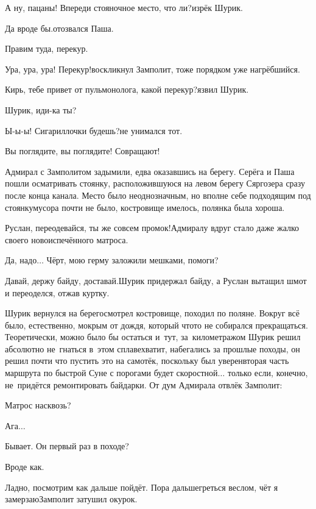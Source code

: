 \diagdash А ну, пацаны! Впереди стояночное место, что ли?\mdash изрёк Шурик.

\diagdash Да вроде бы.\mdash отозвался Паша.

\diagdash Правим туда, перекур. 

\diagdash Ура, ура, ура! Перекур!\mdash воскликнул Замполит, тоже порядком уже нагрёбшийся.

\diagdash Кирь, тебе привет от пульмонолога, какой перекур?\mdash язвил Шурик.

\diagdash Шурик, иди-ка ты?

\diagdash Ы-ы-ы! Сигариллочки будешь?\mdash не унимался тот.

\diagdash Вы поглядите, вы поглядите! Совращают!

Адмирал с Замполитом задымили, едва оказавшись на берегу. Серёга и Паша пошли осматривать стоянку, расположившуюся на левом берегу Сяргозера сразу после конца канала. Место было неоднозначным, но вполне себе подходящим под стоянку\mdash мусора почти не было, костровище имелось, полянка была хороша. 

\diagdash Руслан, переодевайся, ты же совсем промок!\mdash Адмиралу вдруг стало даже жалко своего новоиспечённого матроса. 

\diagdash Да, надо$\ldots$ Чёрт, мою герму заложили мешками, помоги?

\diagdash Давай, держу байду, доставай.\mdash Шурик придержал байду, а Руслан вытащил шмот и переоделся, отжав куртку. 

Шурик вернулся на берег\mdash осмотрел костровище, походил по поляне. Вокруг всё было, естественно, мокрым от дождя, который что\sdash то не собирался прекращаться. Теоретически, можно было бы остаться и~тут, за~километражом Шурик решил абсолютно не~гнаться в~этом сплаве\mdash хватит, набегались за прошлые походы, он решил почти что пустить это на самотёк, поскольку был уверен\mdash вторая часть маршрута по быстрой Суне с порогами будет скоростной$\ldots$ только если, конечно, не~придётся ремонтировать байдарки. От дум Адмирала отвлёк Замполит:

\diagdash Матрос насквозь?

\diagdash Ага$\ldots$

\diagdash Бывает. Он первый раз в походе?

\diagdash Вроде как.

\diagdash Ладно, посмотрим как дальше пойдёт. Пора дальше\mdash греться веслом, чёт я замерзаю\mdash Замполит затушил окурок.

